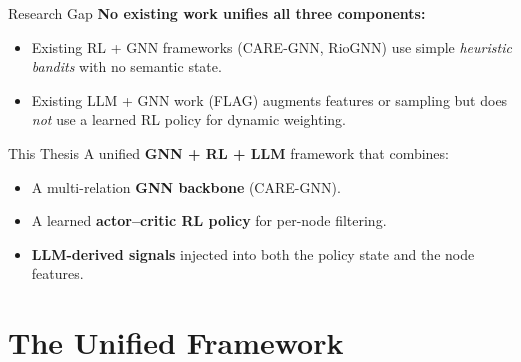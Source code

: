 \documentclass[aspectratio=169,10pt]{beamer}
\begin{document}
\begin{frame}{Research Gap}
    \textbf{No existing work unifies all three components:}
    \vspace{0.5em}
    \begin{itemize}
        \item Existing RL + GNN frameworks (CARE-GNN, RioGNN) use simple
              \emph{heuristic bandits} with no semantic state.
        \item Existing LLM + GNN work (FLAG) augments features or sampling but
              does \emph{not} use a learned RL policy for dynamic weighting.
    \end{itemize}
    \vspace{0.8em}
    \begin{exampleblock}{This Thesis}
        A unified \textbf{GNN + RL + LLM} framework that combines:
        \begin{itemize}
            \item A multi-relation \textbf{GNN backbone} (CARE-GNN).
            \item A learned \textbf{actor--critic RL policy} for per-node filtering.
            \item \textbf{LLM-derived signals} injected into both the policy state
                  and the node features.
        \end{itemize}
    \end{exampleblock}
\end{frame}

\section{The Unified Framework}
\end{document}
